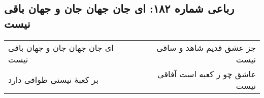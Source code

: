 \begin{center}
\section*{رباعی شماره ۱۸۲: ای جان جهان جان و جهان باقی نیست}
\label{sec:0182}
\begin{longtable}{l p{0.5cm} r}
ای جان جهان جان و جهان باقی نیست
&&
جز عشق قدیم شاهد و ساقی نیست
\\
بر کعبهٔ نیستی طوافی دارد
&&
عاشق چو ز کعبه است آفاقی نیست
\\
\end{longtable}
\end{center}
